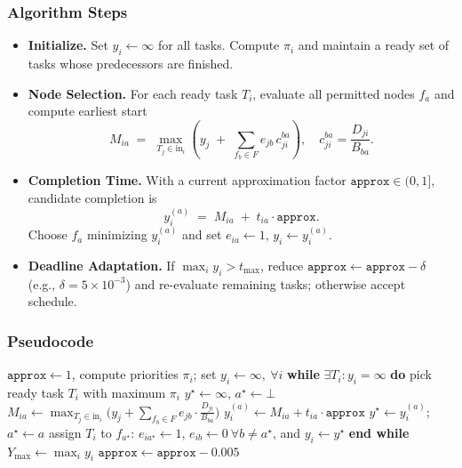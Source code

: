 \documentclass[conference]{IEEEtran}
\begin{document}
\subsubsection{Algorithm Steps}
\begin{itemize}
    \item \textbf{Initialize.} Set \(y_i\gets\infty\) for all tasks. Compute \(\pi_i\) and maintain a ready set of tasks whose predecessors are finished.
    \item \textbf{Node Selection.} For each ready task \(T_i\), evaluate all permitted nodes \(f_a\) and compute earliest start
    \[
    M_{ia} \;=\; \max_{T_j\in \text{in}_i}\!\left( y_j \;+\; \sum_{f_b\in F} e_{jb}\,c_{ji}^{ba}\right),
    \quad c_{ji}^{ba}=\frac{D_{ji}}{B_{ba}}.
    \]
    \item \textbf{Completion Time.} With a current approximation factor \(\texttt{approx}\in(0,1]\), candidate completion is
    \[
    y_i^{(a)} \;=\; M_{ia} \;+\; t_{ia}\cdot \texttt{approx}.
    \]
    Choose \(f_a\) minimizing \(y_i^{(a)}\) and set \(e_{ia}\gets 1\), \(y_i\gets y_i^{(a)}\).
    \item \textbf{Deadline Adaptation.} If \(\max_i y_i > t_{\max}\), reduce \(\texttt{approx}\leftarrow \texttt{approx}-\delta\) (e.g., \(\delta=5\!\times\!10^{-3}\)) and re-evaluate remaining tasks; otherwise accept schedule.
\end{itemize}

\subsubsection{Pseudocode}
\begin{algorithm}[t]
\caption{Bandwidth/Data-Aware Greedy DAG Scheduler}
\label{alg:greedy_scheduler}
\begin{algorithmic}[1]
\STATE $\texttt{approx}\leftarrow 1$, compute priorities $\pi_i$; set $y_i\leftarrow\infty,\ \forall i$
\REPEAT
  \STATE \textbf{while} $\exists T_i: y_i=\infty$ \textbf{do}
    \STATE pick ready task $T_i$ with maximum $\pi_i$
    \STATE $y^\star\leftarrow\infty$, $a^\star\leftarrow\bot$
        \STATE $M_{ia}\leftarrow \max_{T_j\in \text{in}_i}\big(y_j+\sum_{f_b\in F} e_{jb}\cdot \tfrac{D_{ji}}{B_{ba}}\big)$
        \STATE $y_i^{(a)}\leftarrow M_{ia}+t_{ia}\cdot \texttt{approx}$
            \STATE $y^\star\leftarrow y_i^{(a)}$; $a^\star\leftarrow a$ 
        \ENDIF
    \ENDFOR
    \STATE assign $T_i$ to $f_{a^\star}$: $e_{ia^\star}\leftarrow 1$, $e_{ib}\leftarrow 0\ \forall b\neq a^\star$, and $y_i\leftarrow y^\star$
  \STATE \textbf{end while}
  \STATE $Y_{\max}\leftarrow \max_i y_i$
   \STATE $\texttt{approx}\leftarrow \texttt{approx}-0.005$ \ENDIF
{}
\end{algorithmic}
\end{algorithm}
\end{document}
